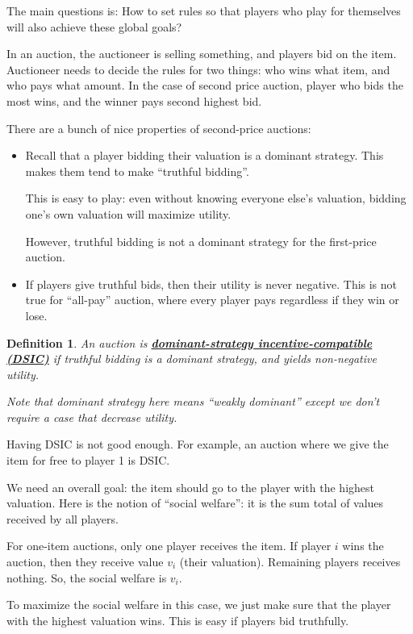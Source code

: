 \documentclass[twoside]{article}
\newtheorem{protodefinition}[prototheorem]{Definition}
\newenvironment{definition}
{\colorlet{shadecolor}{cyan!15}\begin{shaded}\begin{protodefinition}\normalfont}
		{\end{protodefinition}\end{shaded}}
\begin{document}
The main questions is: How to set rules so that players who play for themselves will also achieve these global goals? 

In an auction, the auctioneer is selling something, and players bid on the item. Auctioneer needs to decide the rules for two things: who wins what item, and who pays what amount. In the case of second price auction, player who bids the most wins, and the winner pays second highest bid. 

There are a bunch of nice properties of second-price auctions: \begin{itemize}
\item Recall that a player bidding their valuation is a dominant strategy. This makes them tend to make ``truthful bidding''. 
	
This is easy to play: even without knowing everyone else's valuation, bidding one's own valuation will maximize utility. 
	
However, truthful bidding is not a dominant strategy for the first-price auction. 
	
\item If players give truthful bids, then their utility is never negative. This is not true for ``all-pay'' auction, where every player pays regardless if they win or lose. 
\end{itemize}

\begin{definition}
	An auction is \textbf{\underline{dominant-strategy incentive-compatible (DSIC)}} if truthful bidding is a dominant strategy, and yields non-negative utility. 
		
	Note that dominant strategy here means ``weakly dominant'' except we don't require a case that decrease utility. 
\end{definition}

Having DSIC is not good enough. For example, an auction where we give the item for free to player 1 is DSIC. 

We need an overall goal: the item should go to the player with the highest valuation. Here is the notion of ``social welfare'': it is the sum total of values received by all players. 

For one-item auctions, only one player receives the item. If player $i$ wins the auction, then they receive value $v_i$ (their valuation). Remaining players receives nothing. So, the social welfare is $v_i$. 

To maximize the social welfare in this case, we just make sure that the player with the highest valuation wins. This is easy if players bid truthfully. 
\end{document}
